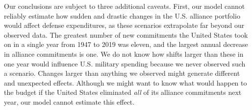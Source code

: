 





Our conclusions are subject to three additional caveats. First, our model cannot reliably estimate how sudden and drastic changes in the U.S. alliance portfolio would affect defense expenditures, as these scenarios extrapolate far beyond our observed data. The greatest number of new commitments the United States took on in a single year from 1947 to 2019 was eleven, and the largest annual decrease in alliance commitments is one. We do not know how shifts larger than these in one year would influence U.S. military spending because we never observed such a scenario. Changes larger than anything we observed might generate different and unexpected effects. Although we might want to know what would happen to the budget if the United States eliminated \textit{all} of its alliance commitments next year, our model cannot estimate this effect.

